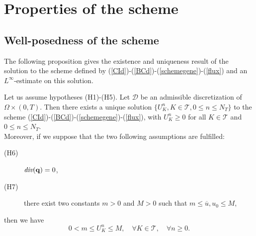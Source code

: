 \documentclass[smallextended]{svjour3}
\begin{document}
\section{Properties of the scheme}


\subsection{Well-posedness of the scheme}

The following proposition gives the existence and uniqueness result of the solution to the scheme defined by (\ref{CId})-(\ref{BCd})-(\ref{schemegene})-(\ref{flux}) and an $L^{\infty}$-estimate on this solution. 

\begin{proposition}
Let us assume hypotheses (H1)-(H5). Let $\mathcal{D}$ be an admissible discretization of $\Omega \times (0,T)$. Then there exists a unique solution $\lbrace U_{K}^{n},K \in \mathcal{T},0\leq n \leq N_{T}\rbrace$ to the scheme (\ref{CId})-(\ref{BCd})-(\ref{schemegene})-(\ref{flux}), with $U_{K}^{n} \geq 0$ for all $K \in \mathcal{T}$ and $0\leq n \leq N_{T}$.\\
Moreover, if we suppose that the two following assumptions are fulfilled:
\begin{description}
\item[(H6)] $ \emph{div} (\mathbf{q})=0$,
\item[(H7)] there exist two constants $m>0$ and $M>0$ such that $m\leq \overline{u},u_{0}\leq M$,
\end{description}
then we have
\begin{equation}
0 <m \leq U^{n}_{K} \leq M, \quad \forall K \in \mathcal{T}, \quad \forall n \geq 0.
\label{estimlinf}
\end{equation}
\end{proposition}
\end{document}
